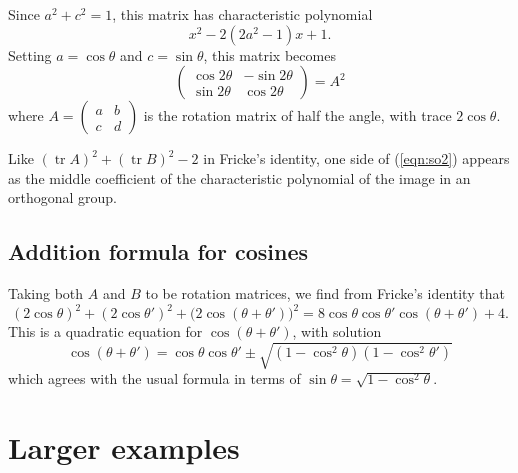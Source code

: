 \documentclass[11pt]{amsart}
\theoremstyle{definition}
\numberwithin{figure}{section}
\numberwithin{equation}{section}
\numberwithin{table}{section}
\newcommand{\tr}{\operatorname{tr}}
\begin{document}
Since $a^2+c^2=1$, this matrix has characteristic polynomial
\[
x^2 - 2(2a^2-1) x + 1.
\]
Setting $a=\cos{\theta}$ and $c=\sin{\theta}$, this matrix becomes
\[
\begin{pmatrix} \cos{2\theta} & -\sin{2\theta} \\ \sin{2\theta} & \cos{2\theta} \end{pmatrix}
= A^2
\]
where $A=\begin{pmatrix} a & b \\ c & d \end{pmatrix}$ is the rotation matrix of half the angle, with trace $2\cos{\theta}$.

Like $(\tr{A})^2+(\tr{B})^2-2$ in Fricke's identity, one side of (\ref{eqn:so2}) appears as the middle coefficient of the characteristic polynomial of the image in an orthogonal group.

\subsection{Addition formula for cosines}

Taking both $A$ and $B$ to be rotation matrices, we find from Fricke's identity that
\[
(2\cos{\theta})^2+(2\cos{\theta'})^2 + \big(2\cos(\theta + \theta')\big)^2 = 8 \cos{\theta} \cos{\theta'} \cos(\theta+\theta') + 4
.
\]
This is a quadratic equation for $\cos(\theta+\theta')$, with solution
\[
\cos(\theta + \theta') = \cos{\theta} \cos{\theta'} \pm \sqrt{(1-\cos^2{\theta})(1-\cos^2{\theta'})}
\]
which agrees with the usual formula in terms of $\sin{\theta}=\sqrt{1-\cos^2{\theta}}$.

\section{Larger examples} \label{sec:symplectic}
\end{document}
